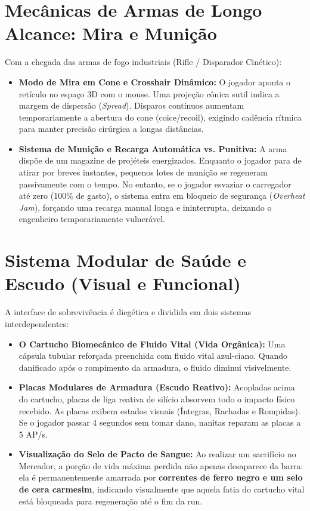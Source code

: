 \documentclass[a4paper,12pt]{report}
\begin{document}
\section{Mecânicas de Armas de Longo Alcance: Mira e Munição}
Com a chegada das armas de fogo industriais (Rifle / Disparador Cinético):
\begin{itemize}
    \item \textbf{Modo de Mira em Cone e Crosshair Dinâmico:} O jogador aponta o retículo no espaço 3D com o mouse. Uma projeção cônica sutil indica a margem de dispersão (\textit{Spread}). Disparos contínuos aumentam temporariamente a abertura do cone (coice/recoil), exigindo cadência rítmica para manter precisão cirúrgica a longas distâncias.
    \item \textbf{Sistema de Munição e Recarga Automática vs. Punitiva:} A arma dispõe de um magazine de projéteis energizados. Enquanto o jogador para de atirar por breves instantes, pequenos lotes de munição se regeneram passivamente com o tempo. No entanto, se o jogador esvaziar o carregador até zero (100\% de gasto), o sistema entra em bloqueio de segurança (\textit{Overheat Jam}), forçando uma recarga manual longa e ininterrupta, deixando o engenheiro temporariamente vulnerável.
\end{itemize}

\section{Sistema Modular de Saúde e Escudo (Visual e Funcional)}
A interface de sobrevivência é diegética e dividida em dois sistemas interdependentes:
\begin{itemize}
    \item \textbf{O Cartucho Biomecânico de Fluido Vital (Vida Orgânica):} Uma cápsula tubular reforçada preenchida com fluido vital azul-ciano. Quando danificado após o rompimento da armadura, o fluido diminui visivelmente.
    \item \textbf{Placas Modulares de Armadura (Escudo Reativo):} Acopladas acima do cartucho, placas de liga reativa de silício absorvem todo o impacto físico recebido. As placas exibem estados visuais (Íntegras, Rachadas e Rompidas). Se o jogador passar 4 segundos sem tomar dano, nanitas reparam as placas a 5 AP/s.
    \item \textbf{Visualização do Selo de Pacto de Sangue:} Ao realizar um sacrifício no Mercador, a porção de vida máxima perdida não apenas desaparece da barra: ela é permanentemente amarrada por \textbf{correntes de ferro negro e um selo de cera carmesim}, indicando visualmente que aquela fatia do cartucho vital está bloqueada para regeneração até o fim da run.
\end{itemize}
\end{document}

